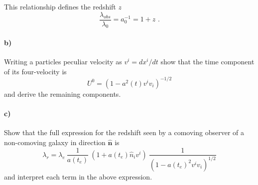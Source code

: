 \documentclass[12pt]{article}
\begin{document}
This relationship defines the redshift $z$
\begin{equation}
    \frac{\lambda_{obs}}{\lambda_0} = a_0^{-1} = 1 + z \text{ .}
\end{equation}

\paragraph{b)} Writing a particles peculiar velocity as $v^i = d x^i / dt$ show that the time component of its four-velocity is
\begin{equation}
    U^0 = (1 - a^2(t) v^i v_i)^{-1/2}
\end{equation}
and derive the remaining components.

\paragraph{c)} Show that the full expression for the redshift seen by a comoving observer of a non-comoving galaxy in direction $\hat{\mathbf{n}}$ is
\begin{equation}
    \lambda_r = \lambda_e \: \frac{1}{a(t_e)} \: \left(1 + a(t_e) \hat{n}_i v^i \right) \: \frac{1}{\left(1 - a(t_e)^2 v^i v_i\right)^{1/2}}
\end{equation}
and interpret each term in the above expression.
\end{document}
